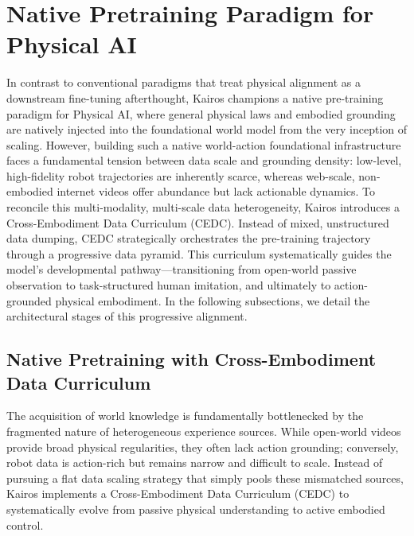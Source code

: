 
\section{Native Pretraining Paradigm for Physical AI}

In contrast to conventional paradigms that treat physical alignment as a downstream fine-tuning afterthought, Kairos champions a native pre-training paradigm for Physical AI, where general physical laws and embodied grounding are natively injected into the foundational world model from the very inception of scaling. However, building such a native world-action foundational infrastructure faces a fundamental tension between data scale and grounding density: low-level, high-fidelity robot trajectories are inherently scarce, whereas web-scale, non-embodied internet videos offer abundance but lack actionable dynamics. To reconcile this multi-modality, multi-scale data heterogeneity, Kairos introduces a Cross-Embodiment Data Curriculum (CEDC). Instead of mixed, unstructured data dumping, CEDC strategically orchestrates the pre-training trajectory through a progressive data pyramid. This curriculum systematically guides the model’s developmental pathway—transitioning from open-world passive observation to task-structured human imitation, and ultimately to action-grounded physical embodiment. In the following subsections, we detail the architectural stages of this progressive alignment.


\subsection{Native Pretraining with Cross-Embodiment Data Curriculum}\label{subsection:curriculum}

The acquisition of world knowledge is fundamentally bottlenecked by the fragmented nature of heterogeneous experience sources. While open-world videos provide broad physical regularities, they often lack action grounding; conversely, robot data is action-rich but remains narrow and difficult to scale. Instead of pursuing a flat data scaling strategy that simply pools these mismatched sources, Kairos implements a Cross-Embodiment Data Curriculum (CEDC) to systematically evolve from passive physical understanding to active embodied control.


